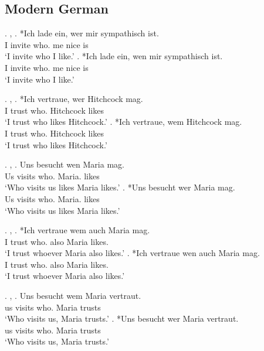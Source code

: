 \subsection{Modern German}

\ex. , 
\ag. *Ich {lade ein}, wer mir sympathisch ist.\\
 I invite\scsub{[acc]} who. me nice is\scsub{[nom]}\\
 `I invite who I like.' 
\bg. *Ich {lade ein}, wen mir sympathisch ist.\\
 I invite\scsub{[acc]} who. me nice is\scsub{[nom]}\\
 `I invite who I like.' 

\ex. , 
\ag. *Ich vertraue, wer Hitchcock mag.\\
 I trust\scsub{[dat]} who. Hitchcock likes\scsub{[nom]}\\
 `I trust who likes Hitchcock.' 
\bg. *Ich vertraue, wem Hitchcock mag.\\
 I trust\scsub{[dat]} who. Hitchcock likes\scsub{[nom]}\\
 `I trust who likes Hitchcock.' 

\ex. , 
\ag. Uns besucht wen Maria mag.\\
 Us visits\scsub{[nom]} who. Maria. likes\scsub{[acc]}\\
 `Who visits us likes Maria likes.' 
\bg. *Uns besucht wer Maria mag.\\
 Us visits\scsub{[nom]} who. Maria. likes\scsub{[acc]}\\
 `Who visits us likes Maria likes.' 

 \ex. , 
\ag. *Ich vertraue wem auch Maria mag. \\
 I trust\scsub{[dat]} who. also Maria likes\scsub{[acc]}.\\
 `I trust whoever Maria also likes.' 
\bg. *Ich vertraue wen auch Maria mag. \\
 I trust\scsub{[dat]} who. also Maria likes\scsub{[acc]}.\\
 `I trust whoever Maria also likes.' 

\ex. , 
\ag. Uns besucht wem Maria vertraut.\\
 us visits\scsub{[nom]} who. Maria trusts\scsub{[dat]}\\
 `Who visits us, Maria trusts.' 
\bg. *Uns besucht wer Maria vertraut.\\
 us visits\scsub{[nom]} who. Maria trusts\scsub{[dat]}\\
 `Who visits us, Maria trusts.' 

